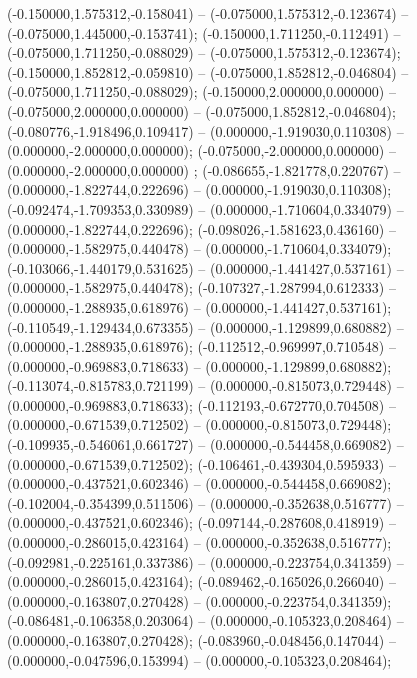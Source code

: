  (-0.150000,1.575312,-0.158041) -- (-0.075000,1.575312,-0.123674) -- (-0.075000,1.445000,-0.153741);
 (-0.150000,1.711250,-0.112491) -- (-0.075000,1.711250,-0.088029) -- (-0.075000,1.575312,-0.123674);
 (-0.150000,1.852812,-0.059810) -- (-0.075000,1.852812,-0.046804) -- (-0.075000,1.711250,-0.088029);
 (-0.150000,2.000000,0.000000) -- (-0.075000,2.000000,0.000000) -- (-0.075000,1.852812,-0.046804);
 (-0.080776,-1.918496,0.109417) -- (0.000000,-1.919030,0.110308) -- (0.000000,-2.000000,0.000000);
 (-0.075000,-2.000000,0.000000) -- (0.000000,-2.000000,0.000000) ;
 (-0.086655,-1.821778,0.220767) -- (0.000000,-1.822744,0.222696) -- (0.000000,-1.919030,0.110308);
 (-0.092474,-1.709353,0.330989) -- (0.000000,-1.710604,0.334079) -- (0.000000,-1.822744,0.222696);
 (-0.098026,-1.581623,0.436160) -- (0.000000,-1.582975,0.440478) -- (0.000000,-1.710604,0.334079);
 (-0.103066,-1.440179,0.531625) -- (0.000000,-1.441427,0.537161) -- (0.000000,-1.582975,0.440478);
 (-0.107327,-1.287994,0.612333) -- (0.000000,-1.288935,0.618976) -- (0.000000,-1.441427,0.537161);
 (-0.110549,-1.129434,0.673355) -- (0.000000,-1.129899,0.680882) -- (0.000000,-1.288935,0.618976);
 (-0.112512,-0.969997,0.710548) -- (0.000000,-0.969883,0.718633) -- (0.000000,-1.129899,0.680882);
 (-0.113074,-0.815783,0.721199) -- (0.000000,-0.815073,0.729448) -- (0.000000,-0.969883,0.718633);
 (-0.112193,-0.672770,0.704508) -- (0.000000,-0.671539,0.712502) -- (0.000000,-0.815073,0.729448);
 (-0.109935,-0.546061,0.661727) -- (0.000000,-0.544458,0.669082) -- (0.000000,-0.671539,0.712502);
 (-0.106461,-0.439304,0.595933) -- (0.000000,-0.437521,0.602346) -- (0.000000,-0.544458,0.669082);
 (-0.102004,-0.354399,0.511506) -- (0.000000,-0.352638,0.516777) -- (0.000000,-0.437521,0.602346);
 (-0.097144,-0.287608,0.418919) -- (0.000000,-0.286015,0.423164) -- (0.000000,-0.352638,0.516777);
 (-0.092981,-0.225161,0.337386) -- (0.000000,-0.223754,0.341359) -- (0.000000,-0.286015,0.423164);
 (-0.089462,-0.165026,0.266040) -- (0.000000,-0.163807,0.270428) -- (0.000000,-0.223754,0.341359);
 (-0.086481,-0.106358,0.203064) -- (0.000000,-0.105323,0.208464) -- (0.000000,-0.163807,0.270428);
 (-0.083960,-0.048456,0.147044) -- (0.000000,-0.047596,0.153994) -- (0.000000,-0.105323,0.208464);
